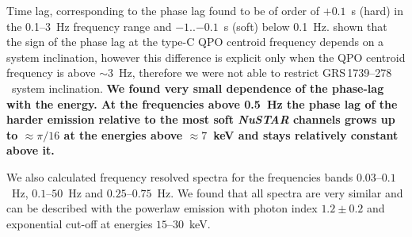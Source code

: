 \documentclass[a4paper,fleqn,usenatbib]{mnras}
\def\grs{{GRS\,1739--278\,}}
\begin{document}
Time lag, corresponding to the phase lag found to be of order of $+0.1$~s (hard) in the 0.1--3~Hz frequency range and $-1$..$-0.1$~s (soft) below 0.1~Hz.
\citet{2017MNRAS.464.2643V} shown that the sign of the phase lag at the type-C QPO centroid frequency depends on a system inclination, however this difference is explicit only when the QPO centroid frequency is above $\sim3$~Hz, therefore we were not able to restrict \grs\ system inclination.
{\bf 
We found very small dependence of the phase-lag with the energy.
At the frequencies above 0.5~Hz the phase lag of the harder emission relative to the most soft {\it NuSTAR} channels grows up to $\approx \pi/16$ at the energies above $\approx7$~keV and stays relatively constant above it.
}

We also calculated frequency resolved spectra for the frequencies bands $0.03$--$0.1$~Hz, $0.1$--$50$~Hz and $0.25$--$0.75$~Hz. 
We found that all spectra are very similar and can be described with the powerlaw emission with photon index $1.2\pm0.2$ and exponential cut-off at energies $15$--$30$~keV.
\end{document}
